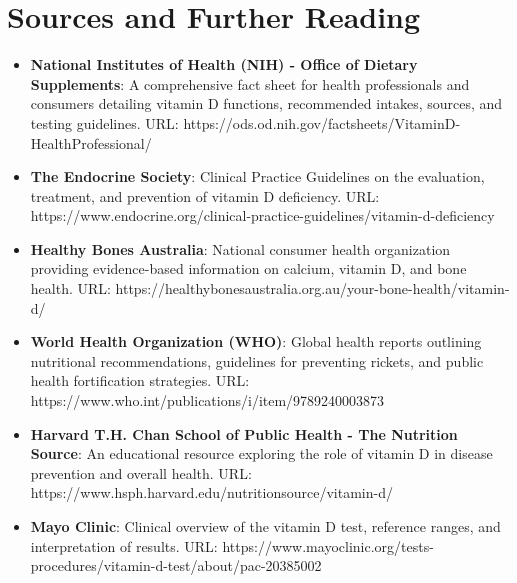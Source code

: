 \section*{Sources and Further Reading}
\begin{itemize}
    \item \textbf{National Institutes of Health (NIH) - Office of Dietary Supplements}: A comprehensive fact sheet for health professionals and consumers detailing vitamin D functions, recommended intakes, sources, and testing guidelines. URL: https://ods.od.nih.gov/factsheets/VitaminD-HealthProfessional/
    \item \textbf{The Endocrine Society}: Clinical Practice Guidelines on the evaluation, treatment, and prevention of vitamin D deficiency. URL: https://www.endocrine.org/clinical-practice-guidelines/vitamin-d-deficiency
    \item \textbf{Healthy Bones Australia}: National consumer health organization providing evidence-based information on calcium, vitamin D, and bone health. URL: https://healthybonesaustralia.org.au/your-bone-health/vitamin-d/
    \item \textbf{World Health Organization (WHO)}: Global health reports outlining nutritional recommendations, guidelines for preventing rickets, and public health fortification strategies. URL: https://www.who.int/publications/i/item/9789240003873
    \item \textbf{Harvard T.H. Chan School of Public Health - The Nutrition Source}: An educational resource exploring the role of vitamin D in disease prevention and overall health. URL: https://www.hsph.harvard.edu/nutritionsource/vitamin-d/
    \item \textbf{Mayo Clinic}: Clinical overview of the vitamin D test, reference ranges, and interpretation of results. URL: https://www.mayoclinic.org/tests-procedures/vitamin-d-test/about/pac-20385002
\end{itemize}